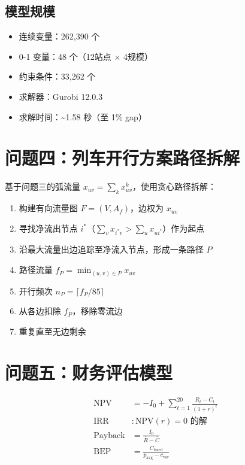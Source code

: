 \documentclass[12pt,a4paper,fontset=none]{ctexart}
\begin{document}
\subsection*{模型规模}
\begin{itemize}
    \item 连续变量：262,390 个
    \item 0-1 变量：48 个（12站点 $\times$ 4规模）
    \item 约束条件：33,262 个
    \item 求解器：Gurobi 12.0.3
    \item 求解时间：\textasciitilde 1.58 秒（至 1\% gap）
\end{itemize}

\section*{问题四：列车开行方案路径拆解}

基于问题三的弧流量 $x_{uv} = \sum_k x_{uv}^k$，使用贪心路径拆解：

\begin{enumerate}
    \item 构建有向流量图 $F=(V, A_f)$，边权为 $x_{uv}$
    \item 寻找净流出节点 $i^*$（$\sum_v x_{i^*v} > \sum_u x_{ui^*}$）作为起点
    \item 沿最大流量出边追踪至净流入节点，形成一条路径 $P$
    \item 路径流量 $f_P = \min_{(u,v) \in P} x_{uv}$
    \item 开行频次 $n_P = \lceil f_P / 85 \rceil$
    \item 从各边扣除 $f_P$，移除零流边
    \item 重复直至无边剩余
\end{enumerate}

\section*{问题五：财务评估模型}

\begin{align}
\text{NPV} &= -I_0 + \sum_{t=1}^{20} \frac{R_t - C_t}{(1+r)^t} \\
\text{IRR} &: \text{NPV}(r) = 0 \text{ 的解} \\
\text{Payback} &= \frac{I_0}{\bar{R} - \bar{C}} \\
\text{BEP} &= \frac{C_{\text{fixed}}}{p_{\text{avg}} - c_{\text{var}}}
\end{align}
\end{document}
